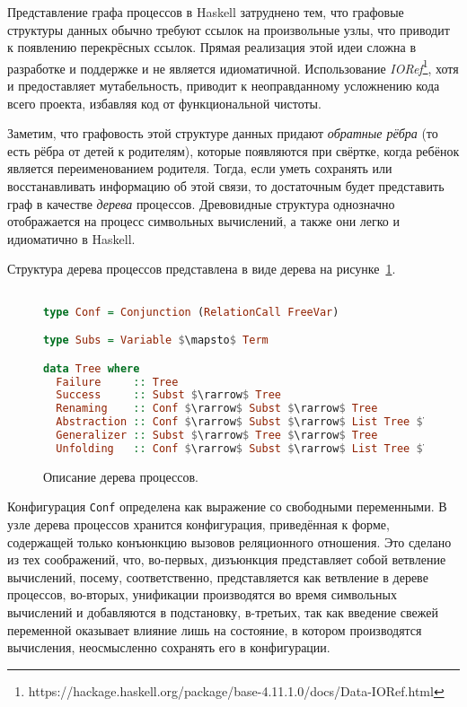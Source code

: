 
Представление графа процессов в Haskell затруднено тем, что графовые
структуры данных обычно требуют ссылок на произвольные узлы,
что приводит к появлению перекрёсных ссылок. Прямая реализация этой
идеи сложна в разработке и поддержке и не является идиоматичной.
Использование \emph{IORef}\footnote{https://hackage.haskell.org/package/base-4.11.1.0/docs/Data-IORef.html},
хотя и предоставляет мутабельность, приводит к неоправданному усложнению кода всего проекта,
избавляя код от функциональной чистоты.

Заметим, что графовость этой структуре данных придают \emph{обратные рёбра}
(то есть рёбра от детей к родителям), которые появляются при свёртке, когда ребёнок
является переименованием родителя.
Тогда, если уметь сохранять или восстанавливать информацию об этой связи, то
достаточным будет представить граф в качестве \emph{дерева} процессов.
Древовидные структура однозначно отображается на процесс символьных вычислений,
а также они легко и идиоматично в Haskell.

Структура дерева процессов представлена в виде дерева на рисунке~\ref{fig:ptree}.

\begin{figure}[h!]
\begin{lstlisting}[mathescape,language=Haskell,extendedchars=\true,frame=single,basicstyle=\ttfamily]

type Conf = Conjunction (RelationCall FreeVar)

type Subs = Variable $\mapsto$ Term

data Tree where
  Failure     :: Tree
  Success     :: Subst $\rarrow$ Tree
  Renaming    :: Conf $\rarrow$ Subst $\rarrow$ Tree
  Abstraction :: Conf $\rarrow$ Subst $\rarrow$ List Tree $\rarrow$ Tree
  Generalizer :: Subst $\rarrow$ Tree $\rarrow$ Tree
  Unfolding   :: Conf $\rarrow$ Subst $\rarrow$ List Tree $\rarrow$ Tree
\end{lstlisting}
\caption{Описание дерева процессов.}
\label{fig:ptree}
\end{figure}

Конфигурация \lstinline{Conf} определена как выражение со свободными переменными.
В узле дерева процессов хранится конфигурация, приведённая к форме, содержащей только конъюнкцию вызовов
реляционного отношения. Это сделано из тех соображений, что, во-первых, дизъюнкция представляет
собой ветвление вычислений, посему, соответственно, представляется как ветвление в дереве процессов,
во-вторых, унификации производятся во время символьных вычислений и добавляются в подстановку,
в-третьих, так как введение свежей переменной оказывает влияние лишь на состояние, в котором производятся вычисления,
неосмысленно сохранять его в конфигурации.


